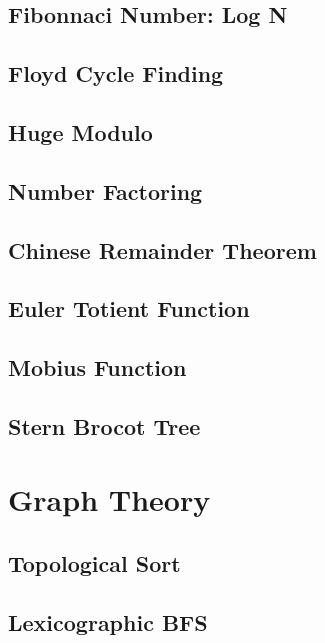 \documentclass{article}
\begin{document}
    \subsection{Fibonnaci Number: Log N}
    \subsection{Floyd Cycle Finding}
        
    \subsection{Huge Modulo}
        
    \subsection{Number Factoring}
        
    \subsection{Chinese Remainder Theorem}
        
    \subsection{Euler Totient Function}
        
    \subsection{Mobius Function}

    \subsection{Stern Brocot Tree}
        

\section{Graph Theory}
    \subsection{Topological Sort}
        
    \subsection{Lexicographic BFS}
        
\end{document}
